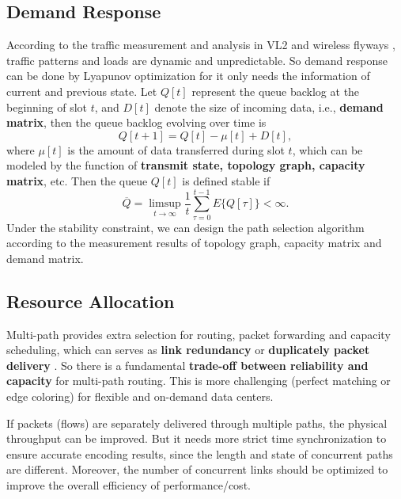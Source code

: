 \documentclass[journal,onecolumn,11pt]{IEEEtran}
\begin{document}
\subsection{Demand Response}

According to the traffic measurement and analysis in VL2 \cite{Greenberg:2009:VSF:1592568.1592576} and wireless flyways \cite{Halperin:2011:ADC:2018436.2018442}, traffic patterns and loads are dynamic and unpredictable. So demand response can be done by Lyapunov optimization for it only needs the information of current and previous state. Let $Q[t]$ represent the queue backlog at the beginning of slot $t$, and $D[t]$ denote the size of incoming data, i.e., \textbf{demand matrix}, then the queue backlog evolving over time is
\begin{equation}
 Q[t+1]=Q[t]-\mu[t]+D[t],
 \label{queue}
\end{equation}
where $\mu[t]$ is the amount of data transferred during slot $t$, which can be modeled by the function of \textbf{transmit state, topology graph, capacity matrix}, etc. Then the queue $Q[t]$ is defined stable if
\begin{equation}
 \overline{Q}=\limsup_{t\rightarrow\infty}\frac{1}{t}\sum_{\tau=0}^{t-1}E\{Q[\tau]\}<\infty.
 \label{stable}
\end{equation}
Under the stability constraint, we can design the path selection algorithm according to the measurement results of topology graph, capacity matrix and demand matrix.

\subsection{Resource Allocation}

Multi-path provides extra selection for routing, packet forwarding and capacity scheduling, which can serves as \textbf{link redundancy} \cite{Wu:2012:NAD:2342356.2342438} or \textbf{duplicately packet delivery} \cite{Guo:2009:BHP:1592568.1592577}. So there is a fundamental \textbf{trade-off between reliability and capacity} for multi-path routing. This is more challenging (perfect matching or edge coloring) for flexible and on-demand data centers.

If packets (flows) are separately delivered through multiple paths, the physical throughput can be improved. But it needs more strict time synchronization to ensure accurate encoding results, since the length and state of concurrent paths are different. Moreover, the number of concurrent links should be optimized to improve the overall efficiency of performance/cost.
\end{document}
